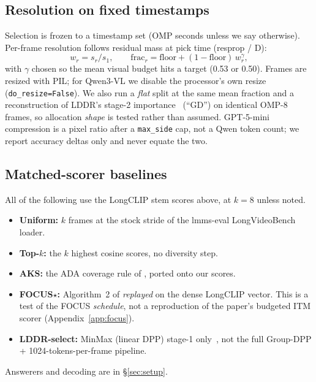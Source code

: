 \documentclass[11pt]{article}
\begin{document}
\subsection{Resolution on fixed timestamps}
Selection is frozen to a timestamp set (OMP seconds unless we say otherwise).
Per-frame resolution follows residual mass at pick time (resprop / D):
\begin{equation}
w_r = s_r / s_1, \qquad
\mathrm{frac}_r = \mathrm{floor} + (1-\mathrm{floor})\, w_r^{\gamma},
\end{equation}
with $\gamma$ chosen so the mean visual budget hits a target (0.53 or 0.50).
Frames are resized with PIL; for Qwen3-VL we disable the processor's own resize (\texttt{do\_resize=False}).
We also run a \emph{flat} split at the same mean fraction and a reconstruction of LDDR's stage-2 importance~\citep{chen2026lddr} (``GD'') on identical OMP-8 frames, so allocation \emph{shape} is tested rather than assumed.
GPT-5-mini compression is a pixel ratio after a \texttt{max\_side} cap, not a Qwen token count; we report accuracy deltas only and never equate the two.

\subsection{Matched-scorer baselines}
All of the following use the LongCLIP stem scores above, at $k{=}8$ unless noted.
\begin{itemize}
\item \textbf{Uniform:} $k$ frames at the stock stride of the lmms-eval LongVideoBench loader.
\item \textbf{Top-$k$:} the $k$ highest cosine scores, no diversity step.
\item \textbf{AKS:} the ADA coverage rule of \citet{tang2025aks}, ported onto our scores.
\item \textbf{FOCUS$\star$:} Algorithm~2 of \citet{zhu2025focus} \emph{replayed} on the dense LongCLIP vector.
This is a test of the FOCUS \emph{schedule}, not a reproduction of the paper's budgeted ITM scorer (Appendix~\ref{app:focus}).
\item \textbf{LDDR-select:} MinMax (linear DPP) stage-1 only~\citep{chen2026lddr}, not the full Group-DPP + 1024-tokens-per-frame pipeline.
\end{itemize}
Answerers and decoding are in \S\ref{sec:setup}.

\end{document}
